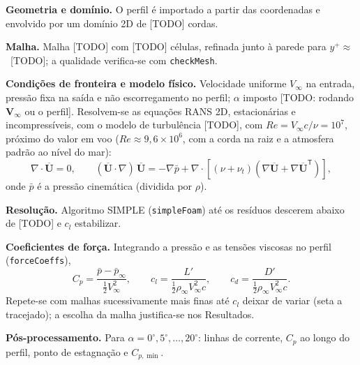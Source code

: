 \begin{etapas}
  \item \textbf{Geometria e domínio.} O perfil é importado a partir das
  coordenadas e envolvido por um domínio 2D de [TODO] cordas.
  \item \textbf{Malha.} Malha [TODO] com [TODO] células, refinada junto à parede
  para $y^+ \approx$~[TODO]; a qualidade verifica-se com \texttt{checkMesh}.
  \item \textbf{Condições de fronteira e modelo físico.} Velocidade uniforme
  $V_\infty$ na entrada, pressão fixa na saída e não escorregamento no perfil;
  $\alpha$ imposto [TODO: rodando $\mathbf{V}_\infty$ ou o perfil]. Resolvem-se as
  equações RANS 2D, estacionárias e incompressíveis, com o modelo de turbulência
  [TODO], com $Re = V_\infty c/\nu = 10^{7}$, próximo do valor em voo
  ($Re \approx 9{,}6\times10^{6}$, com a corda na raiz e a atmosfera padrão
  ao nível do mar):
  \[
    \nabla\cdot\overline{\mathbf{U}} = 0, \qquad
    (\overline{\mathbf{U}}\cdot\nabla)\,\overline{\mathbf{U}} =
    -\nabla \bar{p} + \nabla\cdot\left[(\nu + \nu_t)
    \left(\nabla\overline{\mathbf{U}} + \nabla\overline{\mathbf{U}}^{\mathsf{T}}\right)\right],
  \]
  onde $\bar{p}$ é a pressão cinemática (dividida por $\rho$).
  \item \textbf{Resolução.} Algoritmo SIMPLE (\texttt{simpleFoam}) até os
  resíduos descerem abaixo de [TODO] e $c_l$ estabilizar.
  \item \textbf{Coeficientes de força.} Integrando a pressão e as tensões
  viscosas no perfil (\texttt{forceCoeffs}),
  \[
    C_p = \frac{\bar{p} - \bar{p}_\infty}{\tfrac{1}{2}V_\infty^2}, \qquad
    c_l = \frac{L'}{\tfrac{1}{2}\rho_\infty V_\infty^2 c}, \qquad
    c_d = \frac{D'}{\tfrac{1}{2}\rho_\infty V_\infty^2 c}.
  \]
  Repete-se com malhas sucessivamente mais finas até $c_l$ deixar de variar
  (seta a tracejado); a escolha da malha justifica-se nos Resultados.
  \item \textbf{Pós-processamento.} Para $\alpha = 0^\circ, 5^\circ, \dots,
  20^\circ$: linhas de corrente, $C_p$ ao longo do perfil, ponto de estagnação e
  $C_{p,\min}$.
\end{etapas}
